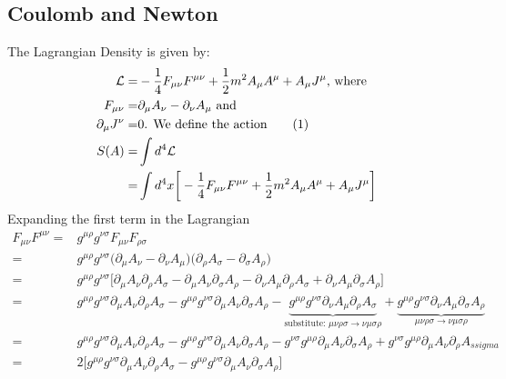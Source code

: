 \documentclass[]{article}
\newcommand\numberthis{\addtocounter{equation}{1}\tag{\theequation}}
\newcommand{\Lagr}{\mathcal{L}}
\begin{document}
\subsection{Coulomb and Newton}
The Lagrangian Density is given by:
\begin{align*}
	\Lagr =& -\frac{1}{4} F_{\mu\nu}F^{\mu\nu} + \frac{1}{2}m^2 A_{\mu}A^{\mu} + A_{\mu}J^{\mu} \text{, where}\\
	F_{\mu\nu} =& \partial_{\mu} A_{\nu} - \partial_{\nu} A_{\mu} \text{ and}\\
	\partial_{\mu}J^{\nu}=& 0 \text{. We define the action} \numberthis \label{eq:EM_continuity}\\
	S(A) =&\int d^4 \Lagr\\
	=&  \int d^4x \bigg[-\frac{1}{4} F_{\mu\nu}F^{\mu\nu} + \frac{1}{2}m^2 A_{\mu}A^{\mu} + A_{\mu}J^{\mu} \bigg]
\end{align*}
Expanding the first term in the Lagrangian
\begin{align*}
	F_{\mu\nu}F^{\mu\nu}=& g^{\mu\rho} g^{\nu\sigma}F_{\mu\nu}F_{\rho\sigma}\\
	=& g^{\mu\rho} g^{\nu\sigma} \big(\partial_{\mu} A_{\nu} - \partial_{\nu} A_{\mu}\big)\big(\partial_{\rho} A_{\sigma} - \partial_{\sigma} A_{\rho}\big)\\
	=& g^{\mu\rho} g^{\nu\sigma}\big[\partial_{\mu} A_{\nu}\partial_{\rho} A_{\sigma} -\partial_{\mu} A_{\nu}\partial_{\sigma} A_{\rho} -\partial_{\nu} A_{\mu}\partial_{\rho} A_{\sigma} + \partial_{\nu} A_{\mu}\partial_{\sigma} A_{\rho}\big]\\
	=& g^{\mu\rho} g^{\nu\sigma} \partial_{\mu} A_{\nu}\partial_{\rho} A_{\sigma} -g^{\mu\rho} g^{\nu\sigma} \partial_{\mu} A_{\nu}\partial_{\sigma} A_{\rho} -\underbrace{g^{\mu\rho} g^{\nu\sigma} \partial_{\nu} A_{\mu}\partial_{\rho} A_{\sigma}}_\text{substitute: $\mu\nu\rho\sigma\rightarrow\nu\mu\sigma\rho$} +\underbrace{g^{\mu\rho} g^{\nu\sigma} \partial_{\nu} A_{\mu}\partial_{\sigma} A_{\rho}}_\text{$\mu\nu\rho\sigma\rightarrow\nu\mu\sigma\rho$}	\\
	=& g^{\mu\rho} g^{\nu\sigma} \partial_{\mu} A_{\nu}\partial_{\rho} A_{\sigma} -g^{\mu\rho} g^{\nu\sigma} \partial_{\mu} A_{\nu}\partial_{\sigma} A_{\rho} - g^{\nu\sigma} g^{\mu\rho} \partial_{\mu} A_{\nu}\partial_{\sigma} A_{\rho} +g^{\nu\sigma} g^{\mu\rho} \partial_{\mu} A_{\nu}\partial_{\rho} A_{ssigma}	\\
	=& 2 \big[g^{\mu\rho} g^{\nu\sigma} \partial_{\mu} A_{\nu}\partial_{\rho} A_{\sigma} -g^{\mu\rho} g^{\nu\sigma} \partial_{\mu} A_{\nu}\partial_{\sigma} A_{\rho}\big]
\end{align*}
\end{document}
